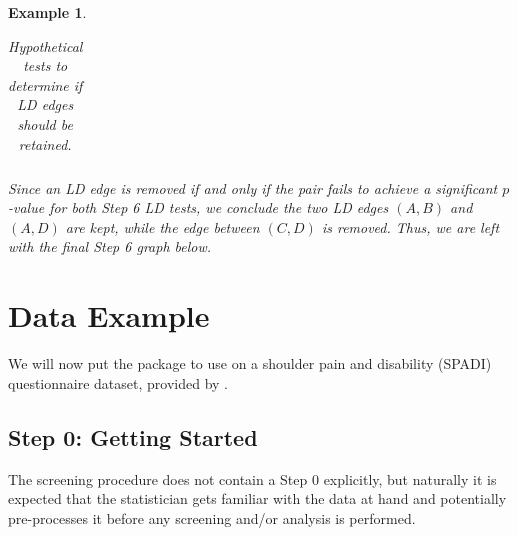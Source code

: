 \documentclass[a4project,12pt]{article}
\theoremstyle{examplestyle}
\newtheorem{example}{Example}[section]
\theoremstyle{defstyle}
\theoremstyle{thmstyle}
\begin{document}
\begin{mybox3}
\begin{example}
\begin{table}[H]
\begin{tabular}{c c c c}
            \hline  
            \end{tabular}
            \caption{Hypothetical tests to determine if LD edges should be retained.}
            \label{tab:step3_example_3b}
        \end{table}
    Since an LD edge is removed if and only if the pair fails to achieve a significant $p$-value for both Step 6 LD tests, we conclude the two LD edges $(A,B)$ and $(A,D)$ are kept, while the edge between $(C,D)$ is removed. Thus, we are left with the final Step 6 graph below.
    \begin{center}
\end{center}
    \end{example}
\end{mybox3}



\section{Data Example}
We will now put the package to use on a shoulder pain and disability (SPADI) questionnaire dataset, provided by \cite{SPADI_data}. 

\subsection{Step 0: Getting Started}
The screening procedure does not contain a Step $0$ explicitly, but naturally it is expected that the statistician gets familiar with the data at hand and potentially pre-processes it before any screening and/or analysis is performed.
\end{document}
